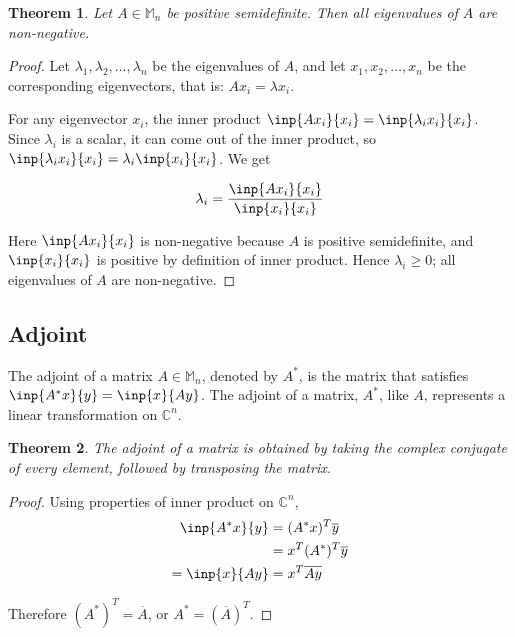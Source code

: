 \documentclass[twoside]{article}
\newcommand*\conj[1]{\overline{#1}}
\newcommand*\adj[1]{#1^*}
\newcommand*\trp[1]{#1^T}
\theoremstyle{plain}
\newtheorem{theorem}{Theorem}
\theoremstyle{definition}
\theoremstyle{remark}
\begin{document}
\begin{theorem} Let \(A \in \mathbb{M}_n\) be positive semidefinite. Then all eigenvalues of \(A\) are non-negative. \end{theorem}
\begin{proof} Let \(\lambda_1, \lambda_2, \ldots , \lambda_n\) be the eigenvalues of \(A\), and let \(x_1, x_2, \ldots , x_n\) be the corresponding eigenvectors, that is: \(Ax_i = \lambda x_i\). 

 For any eigenvector \(x_i\), the inner product \(\inp{Ax_i}{x_i} = \inp{\lambda_i x_i}{x_i}\). Since \(\lambda_i\) is a scalar, it can come out of the inner product, so  \( \inp{\lambda_i x_i}{x_i}  = \lambda_i \inp{x_i}{x_i}\). We get

\[\lambda_i = \frac{\inp{Ax_i}{x_i}}{\inp{x_i}{x_i}}\]

Here \(\inp{Ax_i}{x_i} \) is non-negative because \(A\) is positive semidefinite, and \(\inp{x_i}{x_i}\) is positive by definition of inner product. Hence \(\lambda_i \ge 0\); all eigenvalues of \(A\) are non-negative. \end{proof}


\subsection{Adjoint}

The adjoint of a matrix \(A \in \mathbb{M}_n\), denoted by \(\adj{A}\), is the matrix that  satisfies \(\inp{\adj{A}x}{y} = \inp{x}{Ay}\). The adjoint of a matrix, \(\adj{A}\), like \(A\), represents a linear transformation on \(\mathbb{C}^n\).

\begin{theorem} The adjoint of a matrix is obtained by taking the complex conjugate of every element, followed by transposing the matrix. \end{theorem}

\begin{proof} Using properties of inner product on \(\mathbb{C}^n\),
\begin{equation*} \begin{split}
\inp{\adj{A}x}{y} & = \trp{(\adj{A}x)} \conj{y}  \\
& = \trp{x} \trp{(\adj{A})} \conj{y}\\
= \inp{x}{Ay} & = \trp{x} \conj{Ay} 
\end{split} \end{equation*}

Therefore \(\trp{(\adj{A})} = \conj{A}\), or \(\adj{A} = \trp{(\conj{A})}\). \end{proof}
\end{document}
